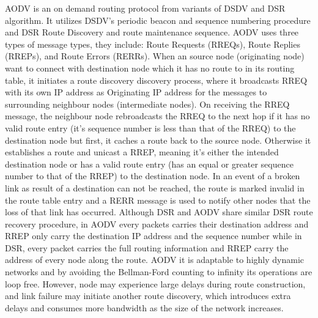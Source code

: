 \documentclass[letterpaper, 10 pt, conference]{ieeeconf}  %
\begin{document}
AODV\cite{DasAdRouting} \cite{Perkins1999Ad-hocRouting} is an on demand routing protocol from variants of DSDV\cite{Perkins1994HighlyComputers} and DSR\cite{JohnsonDSR:Networks} algorithm. It utilizes DSDV's periodic beacon and sequence numbering procedure and DSR Route Discovery and route maintenance sequence. AODV uses three types of message types, they include: Route Requests (RREQs), Route Replies (RREPs), and Route Errors (RERRs). When an source node (originating node) want to connect with destination node which it has no route to in its routing table, it initiates a route discovery discovery process, where it broadcasts RREQ with its own IP address as Originating IP address for the messages to surrounding neighbour nodes (intermediate nodes). On receiving the RREQ message, the neighbour node rebroadcasts the RREQ to the next hop if it has no valid route entry (it's sequence number is less than that of the RREQ) to the destination node but first, it caches a route back to the source node. Otherwise it establishes a route and unicast a RREP, meaning it's either the intended destination node or has a valid route entry (has an equal or greater sequence number to that of the RREP) to the destination node. In an event of a broken link as result of a destination can not be reached, the route is marked invalid in the route table entry and a RERR message is used to notify other nodes that the loss of that link has occurred. Although DSR and AODV share similar DSR route recovery procedure, in AODV every packets carries their destination address and RREP only carry the destination IP address and the sequence number while in DSR, every packet carries the full routing information and RREP carry the address of every node along the route. AODV it is adaptable to highly dynamic networks and by avoiding the Bellman-Ford counting to infinity its operations are loop free. However, node may experience large delays during route construction, and link failure may initiate another route discovery, which introduces extra delays and consumes more bandwidth as the size of the network increases.



\end{document}
